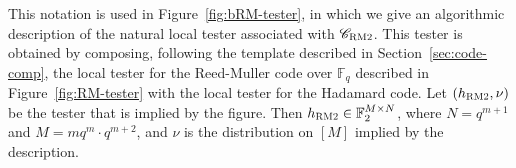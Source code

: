 \documentclass[11pt]{article}
\theoremstyle{definition}
\newcommand{\code}{\mathscr{C}}
\newcommand{\F}{\ensuremath{\mathbb{F}}}
\newcommand{\RM}{\ensuremath{\textsc{RM}}}
\newcommand{\bRM}{\ensuremath{\textsc{RM2}}}
\newcommand{\had}{\textsc{Had}}
\begin{document}
This notation is used in Figure~\ref{fig:bRM-tester}, in which we give an algorithmic description of the natural local tester associated with $\code_{\bRM}$. This tester is obtained by composing, following the template described in Section~\ref{sec:code-comp}, the local tester for the Reed-Muller code over $\F_q$ described in Figure~\ref{fig:RM-tester} with the local tester for the Hadamard code.
Let $(h_\bRM,\nu)$ be the tester that is implied by the figure. Then $h_\bRM\in \F_2^{M\times N}$, where $N=q^{m+1}$ and $M=mq^m\cdot q^{m+2}$, and $\nu$ is the distribution on $[M]$ implied by the description. 


\end{document}
